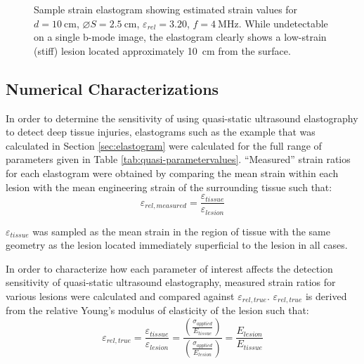 			\begin{figure}[!t]
				\centering
				\caption[Sample strain elastogram for a hard spherical lesion]{Sample strain elastogram showing estimated strain values for $d=\SI{10}{\cm}$, $\diameter S = \SI{2.5}{\cm}$, $\varepsilon_{rel} = 3.20$, $f = \SI{4}{\MHz}$. While undetectable on a single b-mode image, the elastogram clearly shows a low-strain (stiff) lesion located approximately \SI{10}{\cm} from the surface.}
				\label{fig:sample_elastogram}
			\end{figure}

		\subsection{Numerical Characterizations}
			\label{sec:numericalcharacterizations}
			In order to determine the sensitivity of using quasi-static ultrasound elastography to detect deep tissue injuries, elastograms such as the example that was calculated in Section \ref{sec:elastogram} were calculated for the full range of parameters given in Table \ref{tab:quasi-parametervalues}. ``Measured'' strain ratios for each elastogram were obtained by comparing the mean strain within each lesion with the mean engineering strain of the surrounding tissue such that:
			\begin{equation}
				\varepsilon_{rel,measured} = \frac{\varepsilon_{tissue}}{\varepsilon_{lesion}}
			\end{equation}

			$\varepsilon_{tissue}$ was sampled as the mean strain in the region of tissue with the same geometry as the lesion located immediately superficial to the lesion in all cases.

			In order to characterize how each parameter of interest affects the detection sensitivity of quasi-static ultrasound elastography, measured strain ratios for various lesions were calculated and compared against $\varepsilon_{rel,true}$. $\varepsilon_{rel,true}$ is derived from the relative Young's modulus of elasticity of the lesion such that:
			\begin{equation}
				\varepsilon_{rel,true} = \frac{\varepsilon_{tissue}}{\varepsilon_{lesion}} = \frac{\left(\frac{\sigma_{applied}}{E_{tissue}}\right)}{\left(\frac{\sigma_{applied}}{E_{lesion}}\right)} = \frac{E_{lesion}}{E_{tissue}}
			\end{equation}

